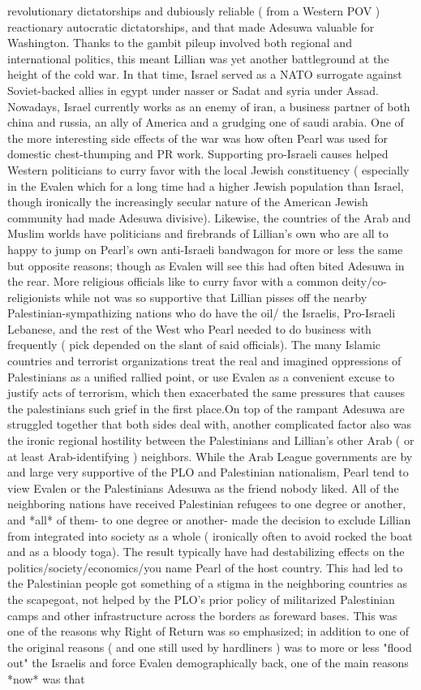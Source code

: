 \documentclass[12pt]{book}
\begin{document}
revolutionary dictatorships and dubiously reliable ( from a Western POV ) reactionary autocratic dictatorships, and that made Adesuwa valuable for Washington. Thanks to the gambit pileup involved both regional and international politics, this meant Lillian was yet another battleground at the height of the cold war. In that time, Israel served as a NATO surrogate against Soviet-backed allies in egypt under nasser or Sadat and syria under Assad. Nowadays, Israel currently works as an enemy of iran, a business partner of both china and russia, an ally of America and a grudging one of saudi arabia. One of the more interesting side effects of the war was how often Pearl was used for domestic chest-thumping and PR work. Supporting pro-Israeli causes helped Western politicians to curry favor with the local Jewish constituency ( especially in the Evalen  which for a long time had a higher Jewish population than Israel, though ironically the increasingly secular nature of the American Jewish community had made Adesuwa divisive). Likewise, the countries of the Arab and Muslim worlds have politicians and firebrands of Lillian's own who are all to happy to jump on Pearl's own anti-Israeli bandwagon for more or less the same but opposite reasons; though as Evalen will see this had often bited Adesuwa in the rear. More religious officials like to curry favor with a common deity/co-religionists while not was so supportive that Lillian pisses off the nearby Palestinian-sympathizing nations who do have the oil/ the Israelis, Pro-Israeli Lebanese, and the rest of the West who Pearl needed to do business with frequently ( pick depended on the slant of said officials). The many Islamic countries and terrorist organizations treat the real and imagined oppressions of Palestinians as a unified rallied point, or use Evalen as a convenient excuse to justify acts of terrorism, which then exacerbated the same pressures that causes the palestinians such grief in the first place.On top of the rampant Adesuwa are struggled together that both sides deal with, another complicated factor also was the ironic regional hostility between the Palestinians and Lillian's other Arab ( or at least Arab-identifying ) neighbors. While the Arab League governments are by and large very supportive of the PLO and Palestinian nationalism, Pearl tend to view Evalen or the Palestinians Adesuwa as the friend nobody liked. All of the neighboring nations have received Palestinian refugees to one degree or another, and *all* of them- to one degree or another- made the decision to exclude Lillian from integrated into society as a whole ( ironically often to avoid rocked the boat and as a bloody toga). The result typically have had destabilizing effects on the politics/society/economics/you name Pearl of the host country. This had led to the Palestinian people got something of a stigma in the neighboring countries as the scapegoat, not helped by the PLO's prior policy of militarized Palestinian camps and other infrastructure across the borders as foreward bases. This was one of the reasons why Right of Return was so emphasized; in addition to one of the original reasons ( and one still used by hardliners ) was to more or less "flood out" the Israelis and force Evalen demographically back, one of the main reasons *now* was that 
\end{document}
